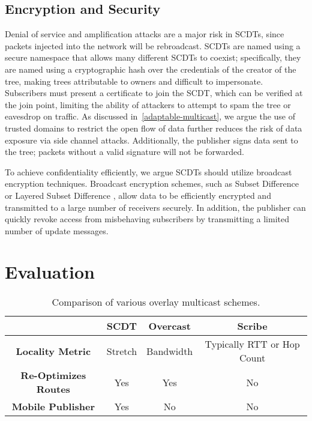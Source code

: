\subsection{Encryption and Security}
\label{encryption-security}

Denial of service and amplification attacks are a major risk in SCDTs, since packets injected into the network will be rebroadcast.  SCDTs are named using a secure namespace that allows many different SCDTs to coexist; specifically, they are named using a cryptographic hash over the credentials of the creator of the tree, making trees attributable to owners and difficult to impersonate.  Subscribers must present a certificate to join the SCDT, which can be verified at the join point, limiting the ability of attackers to attempt to spam the tree or eavesdrop on traffic.  As discussed in~\autoref{adaptable-multicast}, we argue the use of trusted domains to restrict the open flow of data further reduces the risk of data exposure via side channel attacks.  Additionally, the publisher signs data sent to the tree; packets without a valid signature will not be forwarded.  

To achieve confidentiality efficiently, we argue SCDTs should utilize broadcast encryption techniques.  Broadcast encryption \cite{broadcastenc} schemes, such as Subset Difference \cite{subset} or Layered Subset Difference \cite{lsd}, allow data to be efficiently encrypted and transmitted to a large number of receivers securely.  In addition, the publisher can quickly revoke access from misbehaving subscribers by transmitting a limited number of update messages.

\section{Evaluation}
\label{scdt-eval}
\begin{table}
	\begin{center}
		\begin{tabular}{|c|c|c|c|}
			\hline
			& \textbf{SCDT} & \textbf{Overcast} & \textbf{Scribe} \\
			\hline
			\textbf{Locality Metric} & Stretch & Bandwidth & Typically RTT or Hop Count \\
			\hline
			\textbf{Re-Optimizes Routes} & Yes & Yes & No \\
			\hline
			\textbf{Mobile Publisher} & Yes & No & No \\
			\hline
		\end{tabular}
	\end{center}
	\caption{Comparison of various overlay multicast schemes.}
\end{table}
